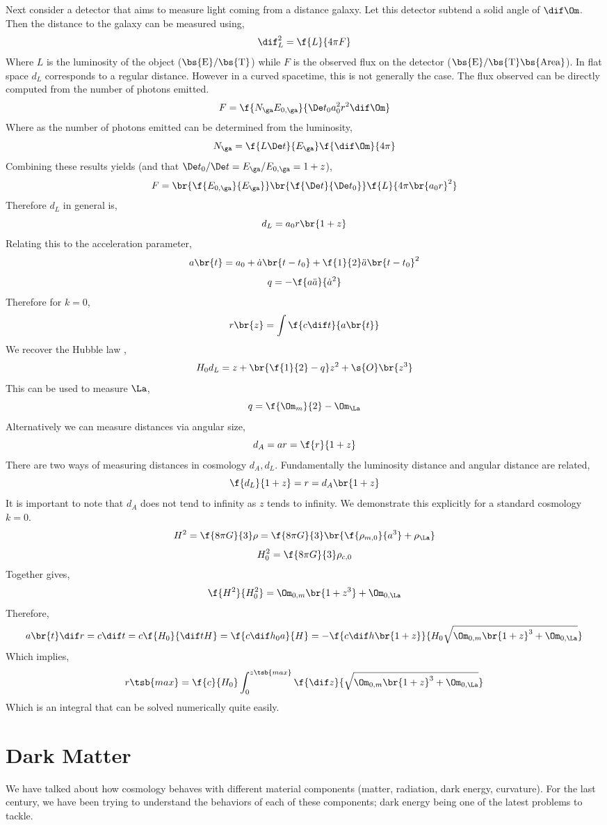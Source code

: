 \documentclass{article}
\begin{document}
Next consider a detector that aims to measure light coming from a distance galaxy. Let this detector subtend a solid angle of $\dif \Om$. Then the distance to the galaxy can be measured using,
\[ \dif_L^2 = \f{L}{4\pi F} \]
Where $L$ is the luminosity of the object ($\bs{\text{E}}/\bs{\text{T}}$) while $F$ is the observed flux on the detector ($\bs{\text{E}}/\bs{\text{T}}\bs{\text{Area}}$). In flat space $d_L$ corresponds to a regular distance. However in a curved spacetime, this is not generally the case. The flux observed can be directly computed from the number of photons emitted.
\[  F = \f{N_{\ga} E_{0,\ga}}{\De t_0 a_0^2 r^2 \dif \Om} \]
Where as the number of photons emitted can be determined from the luminosity,
\[ N_{\ga} = \f{L \De t}{E_\ga} \f{\dif \Om}{4 \pi} \]
Combining these results yields (and that $\De t_0 / \De t = E_\ga / E_{0, \ga} = 1 + z$),
\[ F = \br{\f{E_{0,\ga}}{E_{\ga}}} \br{\f{\De t}{\De t_0}} \f{L}{4 \pi \br{a_0 r}^2} \]
Therefore $d_L$ in general is,
\[ d_L = a_0 r\br{1 + z} \]
Relating this to the acceleration parameter,
\[ a\br{t} = a_0 + \dot a \br{t-t_0} + \f{1}{2} \ddot a \br{t- t_0}^2\]
\[ q = -\f{a \ddot a}{\dot a^2} \]
Therefore for $k=0$,
\[ r\br{z} = \int\f{c \dif t}{a\br{t}} \]
We recover the Hubble law ,
\[ H_0 d_L = z + \br{\f{1}{2} - q} z^2 + \s{O}\br{z^3} \]
This can be used to measure $\La$,
\[ q = \f{\Om_m}{2} - \Om_\La \]
Alternatively we can measure distances via angular size,
\[ d_A = ar = \f{r}{1+z} \]
There are two ways of measuring distances in cosmology $d_A, d_L$. Fundamentally the luminosity distance and angular distance are related,
\[ \f{d_L}{1 + z} = r = d_{A} \br{1 + z} \]
It is important to note that $d_A$ does not tend to infinity as $z$ tends to infinity. We demonstrate this explicitly for a standard cosmology $k=0$.
\[ H^2 = \f{8 \pi G}{3} \rho =\f{8 \pi G}{3} \br{\f{\rho_{m, 0}}{a^3} + \rho_\La}\]
\[ H_0^2 = \f{8 \pi G}{3} \rho_{c, 0} \]
Together gives,
\[ \f{H^2}{H_0^2} = \Om_{0, m} \br{1+z^3} + \Om_{0, \La} \]
Therefore,
\[  a\br{t}\dif r = c\dif t = c \f{H_0}{\dif t H} = \f{c \dif h_0 a}{H} =- \f{c \dif h \br{1+z}}{H_0 \sqrt{\Om_{0,m} \br{1 + z}^3 + \Om_{0,\La}}} \]
Which implies,
\[ r\tsb{max} = \f{c}{H_0} \int_{0}^{z\tsb{max}} \f{\dif z}{\sqrt{\Om_{0,m} \br{1 + z}^3 + \Om_{0,\La}}} \]
Which is an integral that can be solved numerically quite easily.
\section{Dark Matter}
We have talked about how cosmology behaves with different material components (matter, radiation, dark energy, curvature). For the last century, we have been trying to understand the behaviors of each of these components; dark energy being one of the latest problems to tackle. \\
\end{document}
